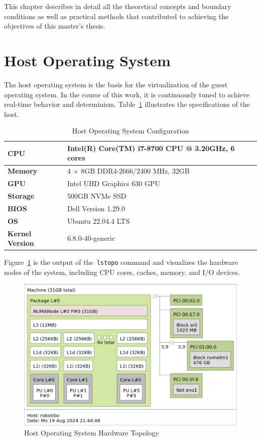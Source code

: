 \documentclass[MMR,Master,english]{style/twbook}
\begin{document}
This chapter describes in detail all the theoretical concepts and boundary conditions as well as practical methods that contributed to achieving the objectives of this master's thesis.

\section{Host Operating System}\label{sec:host_operating_system}
The host operating system is the basis for the virtualization of the guest operating system. In the course of this work, it is continuously tuned to achieve real-time behavior and determinism. Table~\ref{tab:testbed_configuration} illustrates the specifications of the host.

\begin{table}[H]
	\centering
	\caption[Host Operating System Configuration]{Host Operating System Configuration}
	\label{tab:testbed_configuration}
	\setlength{\tabcolsep}{0.5em} %
	{\renewcommand{\arraystretch}{1.2}%
		\begin{tabular}{|l|l|}
			\hline
			\textbf{CPU}            & Intel(R) Core(TM) i7-8700 CPU @ 3.20GHz, 6 cores \\ \hline
			\textbf{Memory}         & 4 $\times$ 8GB DDR4-2666/2400 MHz, 32GB          \\ \hline
			\textbf{GPU}            & Intel UHD Graphics 630 GPU                       \\ \hline
			\textbf{Storage}        & 500GB NVMe SSD                                   \\ \hline
			\textbf{BIOS}           & Dell Version 1.29.0                              \\ \hline
			\textbf{OS}             & Ubuntu 22.04.4 LTS                               \\ \hline
			\textbf{Kernel Version} & 6.8.0-40-generic                                 \\ \hline
		\end{tabular}}
\end{table}

\noindent Figure~\ref{fig:lstopo} is the output of the~\texttt{lstopo} command and visualizes the hardware nodes of the system, including CPU cores, caches, memory, and I/O devices.
\begin{figure}[H]
	\centering
	\includegraphics[width=0.55\columnwidth]{img/methodology/lstopo.png}
	\caption[Host Operating System Hardware Topology]{Host Operating System Hardware Topology}
	\label{fig:lstopo}
\end{figure}
\end{document}
